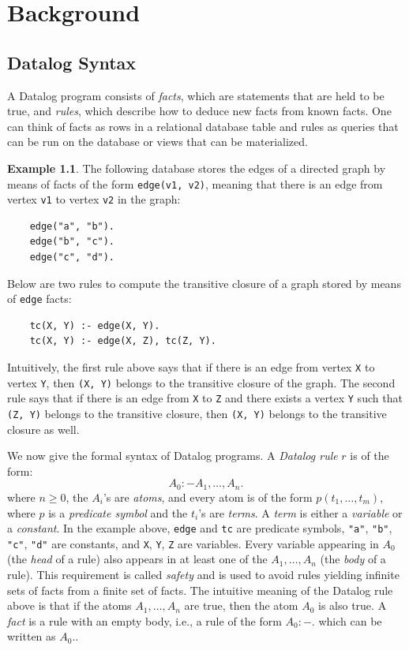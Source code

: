 \documentclass[twoside,11pt,openright]{report}
\theoremstyle{definition}
\newtheorem{exmp}{Example}[chapter]
\begin{document}

\chapter{Background}
\label{ch:background}

\section{Datalog Syntax}

A Datalog program consists of \textit{facts}, which are statements that are held to be true, and \textit{rules}, which describe how to deduce new facts from known facts. One can think of facts as rows in a relational database table and rules as queries that can be run on the database or views that can be materialized.

\begin{exmp}
  The following database stores the edges of a directed graph by means of facts of the form
  \texttt{edge(v1, v2)}, meaning that there is an edge from vertex \texttt{v1} to vertex \texttt{v2} in the graph:
  \begin{verbatim}
    edge("a", "b").
    edge("b", "c").
    edge("c", "d").
  \end{verbatim}
  Below are two rules to compute the transitive closure of a graph stored by means of \texttt{edge} facts:
  \begin{verbatim}
    tc(X, Y) :- edge(X, Y).
    tc(X, Y) :- edge(X, Z), tc(Z, Y).
  \end{verbatim}
  Intuitively, the first rule above says that if there is an edge from vertex \texttt{X} to vertex \texttt{Y}, then \texttt{(X, Y)} belongs to the transitive closure of the graph. The second rule says that if there is an edge from \texttt{X} to \texttt{Z} and there exists a vertex \texttt{Y} such that \texttt{(Z, Y)} belongs to the transitive closure, then \texttt{(X, Y)} belongs to the transitive closure as well.
\end{exmp}
\label{exmp:tc}

We now give the formal syntax of Datalog programs. A \textit{Datalog rule} $r$ is of the form:
$$A_0 :- A_1, \ldots, A_n.$$
where $n \geq 0$, the $A_i$'s are \textit{atoms}, and every atom is of the form $p(t_1, \ldots, t_m)$, where $p$ is a \textit{predicate symbol} and the $t_i$'s are \textit{terms}. A \textit{term} is either a \textit{variable} or a \textit{constant}. In the example above, \texttt{edge} and \texttt{tc} are predicate symbols, \texttt{"a"}, \texttt{"b"}, \texttt{"c"}, \texttt{"d"} are constants, and \texttt{X}, \texttt{Y}, \texttt{Z} are variables. Every variable appearing in $A_0$ (the \textit{head} of a rule) also appears in at least one of the $A_1, \ldots, A_n$ (the \textit{body} of a rule). This requirement is called \textit{safety} and is used to avoid rules yielding infinite sets of facts from a finite set of facts. The intuitive meaning of the Datalog rule above is that if the atoms $A_1, \ldots, A_n$ are true, then the atom $A_0$ is also true. A \textit{fact} is a rule with an empty body, i.e., a rule of the form $A_0 :-.$ which can be written as $A_0.$.
\end{document}
